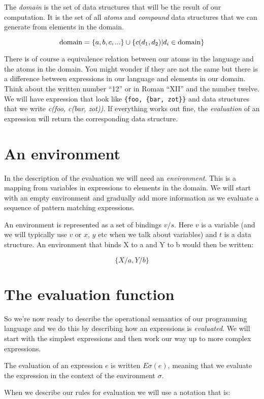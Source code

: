 \documentclass[a4paper,11pt]{article}
\begin{document}
The {\em domain} is the set of data structures that will be the result
of our computation. It is the set of all {\em atoms} and {\em
  compound} data structures that we can generate from elements in the
domain.

$${\rm domain} = \{a,b,c, ...\} \cup \{c(d_1, d_2) | d_i \in {\rm domain}\}$$

There is of course a equivalence relation between our atoms in the
language and the atoms in the domain. You might wonder if they are not
the same but there is a difference between expressions in our language
and elements in our domain. Think about the written number ``12'' or
in Roman ``XII'' and the number twelve. We will have expression that
look like {\tt \{foo, \{bar, zot\}\}} and data structures that we
write {\em c(foo, c(bar, zot))}. If everything works out fine, the
{\em evaluation} of an expression will return the corresponding data
structure.

\section{An environment}

In the description of the evaluation we will need an {\em
  environment}. This is a mapping from variables in expressions to
elements in the domain. We will start with an empty environment and
gradually add more information as we evaluate a sequence of pattern
matching expressions. 

An environment is represented as a set of bindings $v/s$. Here $v$ is
a variable (and we will typically use $v$ or $x$, $y$ etc when we talk
about variables) and $t$ is a data structure. An environment that
binds X to a and Y to b would then be written:

$$\{X/a, Y/b\}$$


\section{The evaluation function}

So we're now ready to describe the operational semantics of our
programming language and we do this by describing how an expressions is
{\em evaluated}. We will start with the simplest expressions and then
work our way up to more complex expressions.

The evaluation of an expression $e$ is written $E\sigma(e)$, meaning
that we evaluate the expression in the context of the environment $\sigma$.

When we describe our rules for evaluation we will use
 a notation that is:
\end{document}

